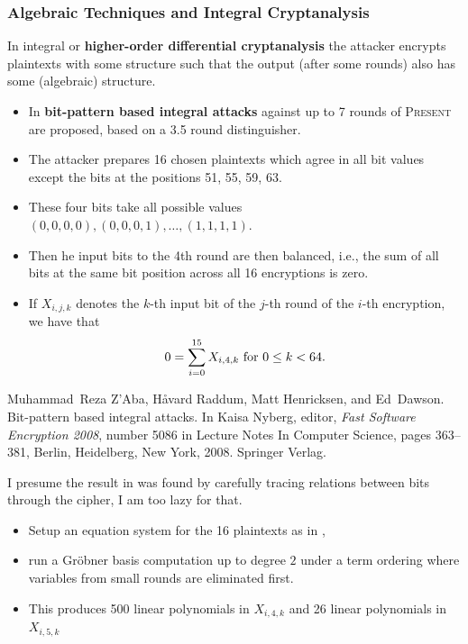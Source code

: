 \documentclass[9pt]{beamer}
\renewcommand{\emph}[1]{\textbf{\color{oxygenorange}#1}\xspace}
\newcommand{\PRESENT}{\textsc{Present}\xspace}
\begin{document}
\begin{frame}[allowframebreaks]
\frametitle{Algebraic Techniques and Integral Cryptanalysis} 

In integral or \emph{higher-order differential cryptanalysis} the attacker encrypts plaintexts with some structure such that the output (after some rounds) also has some (algebraic) structure. 

\framebreak

\begin{itemize}
 \item In \cite{bit-pattern-ia} \emph{bit-pattern based integral attacks} against up to 7 rounds of \PRESENT are proposed, based on a 3.5 round distinguisher.
 \item The attacker prepares 16 chosen plaintexts which agree in all bit values except the bits at the positions 51, 55, 59, 63. 
 \item These four bits take all possible values $(0,0,0,0),(0,0,0,1),\dots,(1,1,1,1)$. 
 \item Then he input bits to the 4th round are then balanced, i.e., the sum of all bits at the same bit position across all 16 encryptions is zero. 
 \item If $X_{i,j,k}$ denotes the $k$-th input bit of the $j$-th round of the $i$-th encryption, we have that $$0 = \sum_{i=0}^{15} X_{i,4,k} \textnormal{ for } 0 \leq k < 64.$$ 
\end{itemize}

\begin{thebibliography}{fooooo}
Muhammad~Reza Z'Aba, Håvard Raddum, Matt Henricksen, and Ed~Dawson.
\newblock Bit-pattern based integral attacks.
\newblock In Kaisa Nyberg, editor, {\em {Fast Software Encryption} 2008},
  number 5086 in Lecture Notes In Computer Science, pages 363--381, Berlin,
  Heidelberg, New York, 2008. Springer Verlag.
\end{thebibliography}

\framebreak

I presume the result in \cite{bit-pattern-ia} was found by carefully tracing relations between bits through the cipher, I am too lazy for that.

\begin{itemize}
 \item Setup an equation system for the 16 plaintexts as in \cite{bit-pattern-ia},
 \item run a Gröbner basis computation up to degree $2$ under a term ordering where variables from small rounds are eliminated first.
 \item This produces 500 linear polynomials in $X_{i,4,k}$ and 26 linear polynomials in $X_{i,5,k}$
\end{itemize}


\end{frame}
\end{document}
